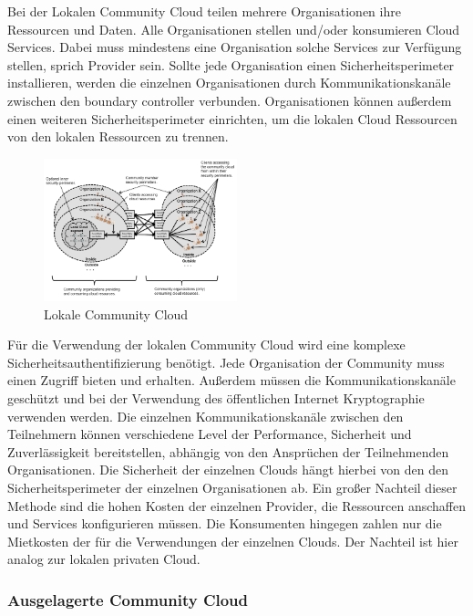 Bei der Lokalen Community Cloud teilen mehrere Organisationen ihre Ressourcen und Daten. Alle Organisationen stellen und/oder konsumieren Cloud Services.
Dabei muss mindestens eine Organisation solche Services zur Verfügung stellen, sprich Provider sein.
Sollte jede Organisation einen Sicherheitsperimeter installieren, werden die einzelnen Organisationen durch Kommunikationskanäle zwischen den \glqq boundary controller\grqq{}{}{}{} verbunden.
Organisationen können außerdem einen weiteren Sicherheitsperimeter einrichten, um die lokalen Cloud Ressourcen von den lokalen Ressourcen zu trennen.
\begin{figure}[h]
    \centering
	\includegraphics[width=0.5\textwidth]{Images/On-siteCommunityCloud}
	\caption{Lokale Community Cloud \cite{Badger}}
	\label{On-siteCommunityCloud}
\end{figure}
Für die Verwendung der lokalen Community Cloud wird eine komplexe Sicherheitsauthentifizierung benötigt. Jede Organisation der Community muss einen Zugriff bieten und erhalten.
Außerdem müssen die Kommunikationskanäle geschützt und bei der Verwendung des öffentlichen Internet Kryptographie verwenden werden. Die einzelnen Kommunikationskanäle zwischen den Teilnehmern 
können verschiedene Level der Performance, Sicherheit und Zuverlässigkeit bereitstellen, abhängig von den Ansprüchen der Teilnehmenden Organisationen. Die Sicherheit der einzelnen Clouds hängt 
hierbei von den den Sicherheitsperimeter der einzelnen Organisationen ab. Ein großer Nachteil dieser Methode sind die hohen Kosten der einzelnen Provider, die Ressourcen 
anschaffen und Services konfigurieren müssen. Die Konsumenten hingegen zahlen nur die Mietkosten der für die Verwendungen der einzelnen Clouds. Der Nachteil ist hier analog zur lokalen privaten Cloud\cite{Badger}.

\subsubsection{Ausgelagerte Community Cloud}

